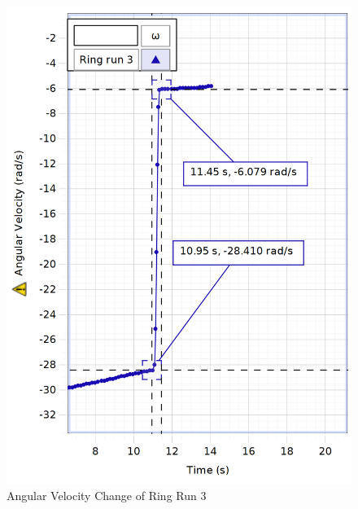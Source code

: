 \begin{figure}[H]
  \centering\includegraphics[width=15cm]{figRingRun3.png}
  \caption{Angular Velocity Change of Ring Run 3}
  \label{fig:RingRun3}
\end{figure}
